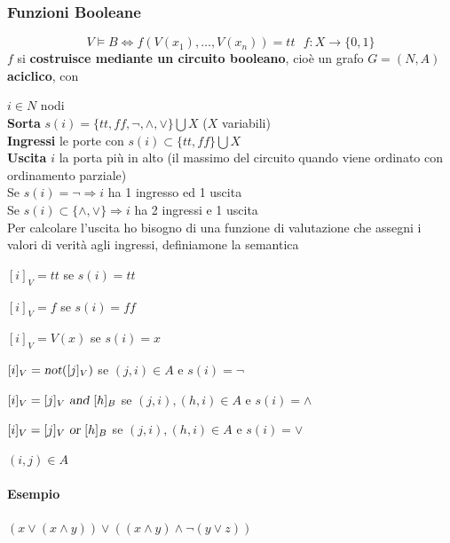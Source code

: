 \documentclass[10pt]{book}
\begin{document}
\subsubsection*{Funzioni Booleane}
$$V \vDash B \Leftrightarrow f(V(x_1), \ldots, V(x_n)) = tt\:\:\: f: X \rightarrow \{0, 1\}$$
$f$ si \textbf{costruisce mediante un circuito booleano}, cioè un grafo $G = (N, A)$ \textbf{aciclico}, con 
\begin{list}{}{}
	\item $i \in N$ nodi\\
	\textbf{Sorta} $s(i) = \{tt, ff, \neg, \wedge, \vee\} \bigcup X$ ($X$ variabili)\\
	\textbf{Ingressi} le porte con $s(i) \subset \{tt, ff\} \bigcup X$\\
	\textbf{Uscita} $i$ la porta più in alto (il massimo del circuito quando viene ordinato con ordinamento parziale)\\
	Se $s(i) = \neg \Rightarrow i$ ha 1 ingresso ed 1 uscita\\
	Se $s(i) \subset \{\wedge, \vee\} \Rightarrow i$ ha 2 ingressi e 1 uscita\\
	Per calcolare l'uscita ho bisogno di una funzione di valutazione che assegni i valori di verità agli ingressi, definiamone la semantica
	\begin{multicols}{2} \begin{list}{}{}
		\item $[i]_V = tt$ se $s(i) = tt$
		\item $[i]_V = f$ se $s(i) = ff$
		\item $[i]_V = V(x)$ se $s(i) = x$
		\item $[i]_V = \textsl{not}([j]_V)$ se $(j, i) \in A$ e $s(i) = \neg$
		\item $[i]_V = [j]_V \textsl{ and } [h]_B$ se $(j, i), (h, i) \in A$ e $s(i) = \wedge$
		\item $[i]_V = [j]_V \textsl{ or } [h]_B$ se $(j, i), (h, i) \in A$ e $s(i) = \vee$
	\end{list} \end{multicols}
	\item $(i, j) \in A$
\end{list}
\paragraph{Esempio} $(x \vee (x \wedge y)) \vee ((x \wedge y) \wedge \neg(y \vee z))$
\end{document}
